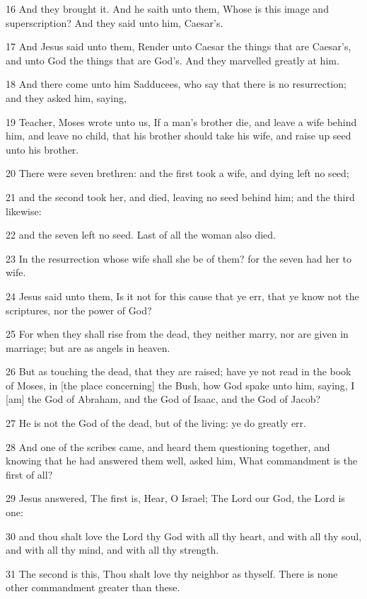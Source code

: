 \par 16 And they brought it. And he saith unto them, Whose is this image and superscription? And they said unto him, Caesar's.
\par 17 And Jesus said unto them, Render unto Caesar the things that are Caesar's, and unto God the things that are God's. And they marvelled greatly at him.
\par 18 And there come unto him Sadducees, who say that there is no resurrection; and they asked him, saying,
\par 19 Teacher, Moses wrote unto us, If a man's brother die, and leave a wife behind him, and leave no child, that his brother should take his wife, and raise up seed unto his brother.
\par 20 There were seven brethren: and the first took a wife, and dying left no seed;
\par 21 and the second took her, and died, leaving no seed behind him; and the third likewise:
\par 22 and the seven left no seed. Last of all the woman also died.
\par 23 In the resurrection whose wife shall she be of them? for the seven had her to wife.
\par 24 Jesus said unto them, Is it not for this cause that ye err, that ye know not the scriptures, nor the power of God?
\par 25 For when they shall rise from the dead, they neither marry, nor are given in marriage; but are as angels in heaven.
\par 26 But as touching the dead, that they are raised; have ye not read in the book of Moses, in [the place concerning] the Bush, how God spake unto him, saying, I [am] the God of Abraham, and the God of Isaac, and the God of Jacob?
\par 27 He is not the God of the dead, but of the living: ye do greatly err.
\par 28 And one of the scribes came, and heard them questioning together, and knowing that he had answered them well, asked him, What commandment is the first of all?
\par 29 Jesus answered, The first is, Hear, O Israel; The Lord our God, the Lord is one:
\par 30 and thou shalt love the Lord thy God with all thy heart, and with all thy soul, and with all thy mind, and with all thy strength.
\par 31 The second is this, Thou shalt love thy neighbor as thyself. There is none other commandment greater than these.
